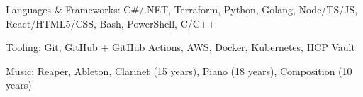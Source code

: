 \documentclass[]{awesome-cv}
\begin{document}



\vspace{-2mm}
	\cventry
	{}
	{}
	{}
	{}
	{\begin{cvitems}
		\item {Languages \& Frameworks: C\#/.NET, Terraform, Python, Golang, Node/TS/JS, React/HTML5/CSS, Bash, PowerShell, C/C++}
		\item {Tooling: Git, GitHub + GitHub Actions, AWS, Docker, Kubernetes, HCP Vault}
		\item {Music: Reaper, Ableton, Clarinet (15 years), Piano (18 years), Composition (10 years)}
	\end{cvitems}}
\end{document}

